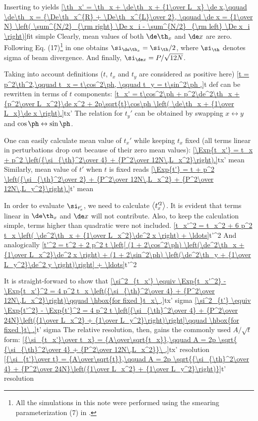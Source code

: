 Inserting  to  yields
\eqref{\th_x' = \th_x + \de\th_x + {1\over L_x} \de x,\qquad \de\th_x = {\De\th_x^{R} + \De\th_x^{L}\over 2}, \qquad \de x = {1\over N} \left( \sum^{N/2}_{\rm right} \De x_i - \sum^{N/2}_{\rm left} \De x_i \right)}{fit simple}
Clearly, mean values of both $\de\th_x$ and $\de x$ are zero. Following Eq. (17)\footnote{%
All the simulations in this note were performed using the smearing parameterization (7) in .
} in  one obtains $\si_{\de\th_x} = \si_\th / 2$, where $\si_\th$ denotes sigma of beam divergence. And finally, $\si_{\de x} = P / \sqrt{12N}$.

Taking into account definitions ($t$, $t_x$ and $t_y$ are considered as positive here)
\eqref{t = p^2\th^2,\qquad t_x = t\cos^2\ph, \qquad t_y = t\sin^2\ph ,}{t def}
 can be rewritten in terms of $t$ components:
\eqref{t_x' = t\cos^2\ph + p^2\de^2\th_x + {p^2\over L_x^2}\de x^2 + 2p\sqrt{t}\cos\ph \left( \de\th_x + {1\over L_x}\de x \right).}{tx'}
The relation for $t_y'$ can be obtained by swapping $x\leftrightarrow y$ and $\cos\ph\leftrightarrow\sin\ph$. 

One can easily calculate mean value of $t_x'$ while keeping $t_x$ fixed (all terms linear in perturbations drop out because of their zero mean values):
\eqref{\Exp{t_x'} = t_x + p^2 \left({\si_{\th}^2\over 4} + {P^2\over 12N\,L_x^2}\right).}{tx' mean}
Similarly, mean value of $t'$ when $t$ is fixed reads
\eqref{\Exp{t'} = t + p^2 \left({\si_{\th}^2\over 2} + {P^2\over 12N\,L_x^2} + {P^2\over 12N\,L_y^2}\right).}{t' mean}

In order to evaluate $\si_{t_x'}$, we need to calculate $\left\langle t_x'^2\right\rangle$. It is evident that terms linear in $\de\th_x$ and $\de x$ will not contribute. Also, to keep the calculation simple, terms higher than quadratic were not included. 
\eqref{t_x'^2 = t_x^2 + 6 p^2 t_x \left( \de^2\th_x + {1\over L_x^2}\de^2 x \right) + \ldots}{t'^2}
And analogically
\eqref{t'^2 = t^2 + 2 p^2 t \left[ (1 + 2\cos^2\ph) \left(\de^2\th_x + {1\over L_x^2}\de^2 x \right) + (1 + 2\sin^2\ph) \left(\de^2\th_y + {1\over L_y^2}\de^2 y \right)\right] + \ldots}{t'^2}

It is straight-forward to show that
\eqref{\si^2_{t_x'} \equiv \Exp{t_x'^2} - \Exp{t_x'}^2 = 4 p^2 t_x \left({\si_{\th}^2\over 4} + {P^2\over 12N\,L_x^2}\right)\qquad \hbox{for fixed }t_x\ ,}{tx' sigma}
\eqref{\si^2_{t'} \equiv \Exp{t'^2} - \Exp{t'}^2 = 4 p^2 t \left[{\si_{\th}^2\over 4} + {P^2\over 24N}\left({1\over L_x^2} + {1\over L_y^2}\right)\right]\qquad \hbox{for fixed }t\ .}{t' sigma}
The relative resolution, then, gains the commonly used $A/\sqrt{t}$ form:
\eqref{{\si_{t_x'}\over t_x}  = {A\over\sqrt{t_x}},\qquad A = 2p \sqrt{ {\si_{\th}^2\over 4} + {P^2\over 12N\,L_x^2}}\ ,}{tx' resolution}
\eqref{{\si_{t'}\over t}  = {A\over\sqrt{t}},\qquad A = 2p \sqrt{{\si_{\th}^2\over 4} + {P^2\over 24N}\left({1\over L_x^2} + {1\over L_y^2}\right)}}{t' resolution}

